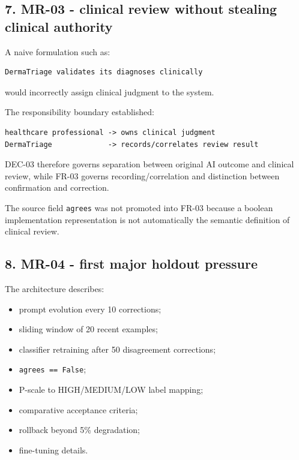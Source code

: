\documentclass[11pt,a4paper]{article}
\providecommand{\tightlist}{\setlength{\itemsep}{0pt}\setlength{\parskip}{0pt}}
\begin{document}
\subsection{7. MR-03 - clinical review without stealing clinical
authority}\label{7-mr-03---clinical-review-without-stealing-clinical-authority}

A naive formulation such as:

\begin{verbatim}
DermaTriage validates its diagnoses clinically
\end{verbatim}

would incorrectly assign clinical judgment to the system.

The responsibility boundary established:

\begin{verbatim}
healthcare professional -> owns clinical judgment
DermaTriage             -> records/correlates review result
\end{verbatim}

DEC-03 therefore governs separation between original AI outcome and
clinical review, while FR-03 governs recording/correlation and
distinction between confirmation and correction.

The source field \texttt{agrees} was not promoted into FR-03 because a
boolean implementation representation is not automatically the semantic
definition of clinical review.

\subsection{8. MR-04 - first major holdout
pressure}\label{8-mr-04---first-major-holdout-pressure}

The architecture describes:

\begin{itemize}
\tightlist
\item
  prompt evolution every 10 corrections;
\item
  sliding window of 20 recent examples;
\item
  classifier retraining after 50 disagreement corrections;
\item
  \texttt{agrees\ ==\ False};
\item
  P-scale to HIGH/MEDIUM/LOW label mapping;
\item
  comparative acceptance criteria;
\item
  rollback beyond 5\% degradation;
\item
  fine-tuning details.
\end{itemize}
\end{document}
